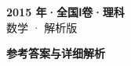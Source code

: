 \documentclass[zihao=-4, a4paper]{ctexart}
\begin{document}
\begin{center}
  {\Large\bfseries 2015 年·全国Ⅰ卷·理科}\\[4pt]
  {\large 数学 · 解析版}
\end{center}
\medskip
{}

\clearpage
{}
\begin{center}{\Large\bfseries 参考答案与详细解析}\end{center}
\medskip

\end{document}
